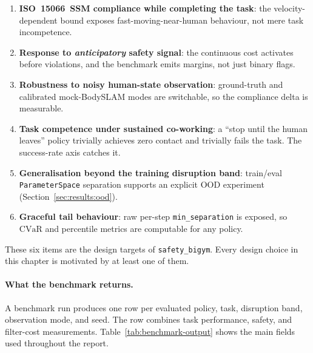 \documentclass[11pt,a4paper]{report}
\newcommand{\ssm}{SSM}
\newcommand{\iso}{ISO~15066}
\newcommand{\cvar}{\ensuremath{\mathrm{CVaR}}}
\newcommand{\sbigym}{\texttt{safety\_bigym}}
\newcommand{\bodyslampp}{BodySLAM\nolinebreak[4]\hspace{-.05em}\raisebox{.2ex}{\scriptsize ++}}
\begin{document}
\begin{enumerate}[topsep=2pt,itemsep=2pt]
\item \textbf{\iso{}~\ssm{} compliance while completing the task}:
  the velocity-dependent bound exposes fast-moving-near-human
  behaviour, not mere task incompetence.
\item \textbf{Response to \emph{anticipatory} safety signal}: the
  continuous cost activates before violations, and the benchmark
  emits margins, not just binary flags.
\item \textbf{Robustness to noisy human-state observation}:
  ground-truth and calibrated mock-\bodyslampp{} modes are
  switchable, so the compliance delta is measurable.
\item \textbf{Task competence under sustained co-working}: a ``stop
  until the human leaves'' policy trivially achieves zero contact
  and trivially fails the task. The success-rate axis catches it.
\item \textbf{Generalisation beyond the training disruption band}:
  train/eval \texttt{ParameterSpace} separation supports an explicit
  OOD experiment (Section~\ref{sec:results:ood}).
\item \textbf{Graceful tail behaviour}: raw per-step
  \texttt{min\_separation} is exposed, so \cvar{} and percentile
  metrics are computable for any policy.
\end{enumerate}

These six items are the design targets of \sbigym{}. Every design
choice in this chapter is motivated by at least one of them.

\paragraph{What the benchmark returns.}
A benchmark run produces one row per evaluated policy, task, disruption
band, observation mode, and seed. The row combines task performance,
safety, and filter-cost measurements. Table~\ref{tab:benchmark-output}
shows the main fields used throughout the report.
\end{document}
